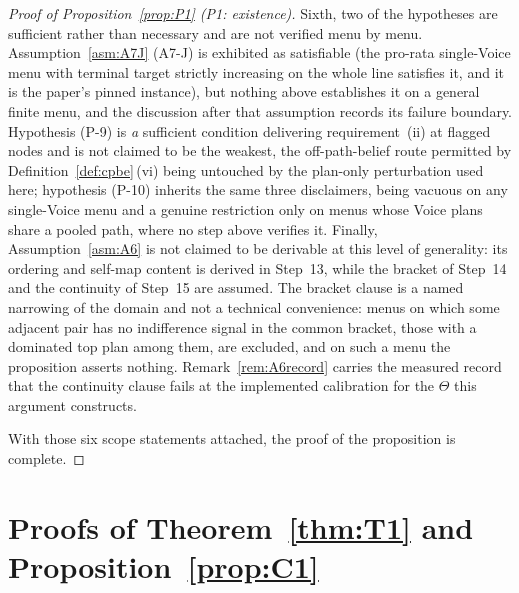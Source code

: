 \documentclass[11pt]{article}
\begin{document}
\begin{proof}[Proof of Proposition~\ref{prop:P1} (P1: existence)]
Sixth, two of the hypotheses are sufficient rather than necessary and are not verified menu by menu.
Assumption~\ref{asm:A7J} (A7-J) is exhibited as satisfiable (the pro-rata single-Voice menu with terminal
target strictly increasing on the whole line satisfies it, and it is the paper's pinned instance),
but nothing above establishes it on a general finite menu, and the discussion after that assumption
records its failure boundary. Hypothesis (P-9) is \emph{a} sufficient condition delivering
requirement~(ii) at flagged nodes and is not claimed to be the weakest, the off-path-belief route
permitted by Definition~\ref{def:cpbe}\,(vi) being untouched by the plan-only perturbation used here;
hypothesis (P-10) inherits the same three disclaimers, being vacuous on any single-Voice menu and a
genuine restriction only on menus whose Voice plans share a pooled path, where no step above verifies
it. Finally, Assumption~\ref{asm:A6} is not claimed to be derivable at this level of generality: its
ordering and self-map content is derived in Step~13, while the bracket of Step~14 and the continuity
of Step~15 are assumed. The bracket clause is a named narrowing of the domain and not a technical
convenience: menus on which some adjacent pair has no indifference signal in the common bracket,
those with a dominated top plan among them, are excluded, and on such a menu the proposition asserts
nothing. Remark~\ref{rem:A6record} carries the measured record that the continuity clause fails at
the implemented calibration for the $\Theta$ this argument constructs.

\medskip
With those six scope statements attached, the proof of the proposition is complete.
\end{proof}

\section{Proofs of Theorem~\ref{thm:T1} and Proposition~\ref{prop:C1}}
\label{sec:proofs-ge}
\end{document}
